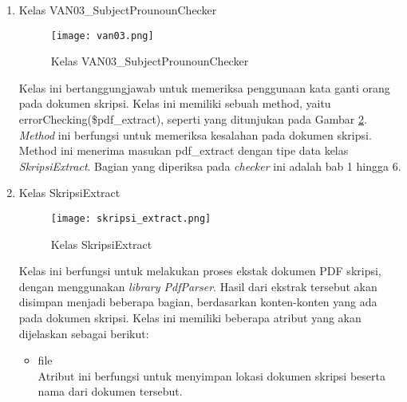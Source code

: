 \begin{enumerate}
	\begin{figure}[H]
	\centering	
	\texttt{[image: ps09.png]}
	\caption{Kelas PS09\_SubChapterChecker}	
	\label{fig:ps09} 
	\end{figure}	
	
	Kelas ini bertanggungjawab untuk memeriksa jumlah sub bab atau sub sub bab yang ada dalam sebuah bab atau sub bab. Kelas ini memiliki sebuah method, yaitu errorChecking(\$pdf\_extract), seperti yang ditunjukan pada Gambar \ref{fig:ps09}. \textit{Method} ini berfungsi untuk memeriksa kesalahan pada dokumen skripsi. Method ini menerima masukan pdf\_extract dengan tipe data kelas \textit{SkripsiExtract}. Bagian yang diperiksa pada \textit{checker} ini adalah halaman daftar isi.
			
	\item Kelas VAN03\_SubjectProunounChecker \\
	
	\begin{figure}[H]
	\centering	
	\texttt{[image: van03.png]}
	\caption{Kelas VAN03\_SubjectProunounChecker}	
	\label{fig:van03} 
	\end{figure}
	
	Kelas ini bertanggungjawab untuk memeriksa penggunaan kata ganti orang pada dokumen skripsi. Kelas ini memiliki sebuah method, yaitu errorChecking(\$pdf\_extract), seperti yang ditunjukan pada Gambar \ref{fig:van03}. \textit{Method} ini berfungsi untuk memeriksa kesalahan pada dokumen skripsi. Method ini menerima masukan pdf\_extract dengan tipe data kelas \textit{SkripsiExtract}. Bagian yang diperiksa pada \textit{checker} ini adalah bab 1 hingga 6.
			
	\item Kelas SkripsiExtract \\
	
	\begin{figure}[H]
	\centering	
	\texttt{[image: skripsi\_extract.png]}
	\caption{Kelas SkripsiExtract}	
	\label{fig:skripsiExtract} 
	\end{figure}
	
	Kelas ini berfungsi untuk melakukan proses ekstak dokumen PDF skripsi, dengan menggunakan \textit{library PdfParser}. Hasil dari ekstrak tersebut akan disimpan menjadi beberapa bagian, berdasarkan konten-konten yang ada pada dokumen skripsi. Kelas ini memiliki beberapa atribut yang akan dijelaskan sebagai berikut:
	
		\begin{itemize}
			\item file \\
			Atribut ini berfungsi untuk menyimpan lokasi dokumen skripsi beserta nama dari dokumen tersebut.
			

\end{itemize}
\end{enumerate}
